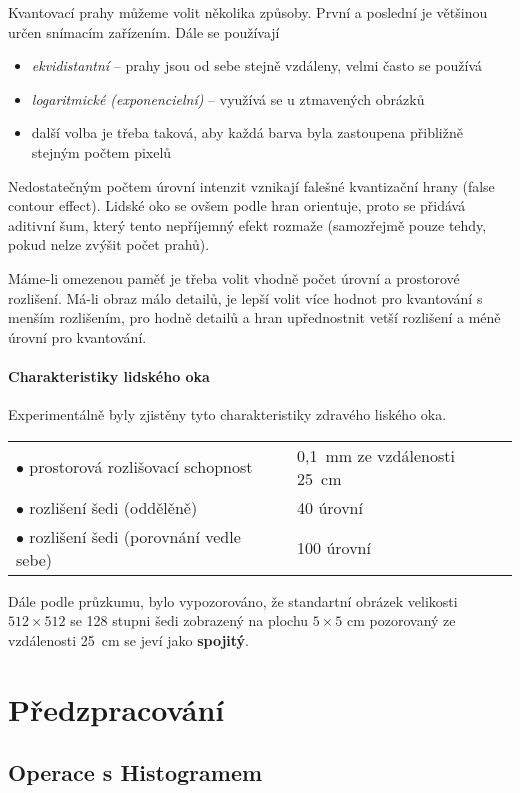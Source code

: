 Kvantovací prahy můžeme volit několika způsoby. První a poslední je většinou určen snímacím zařízením. Dále se používají
\begin{itemize}
\item {\em ekvidistantní} -- prahy jsou od sebe stejně vzdáleny, velmi často se používá
\item {\em logaritmické (exponencielní)} -- využívá se u ztmavených obrázků
\item další volba je třeba taková, aby každá barva byla zastoupena přibližně stejným počtem pixelů
\end{itemize}

Nedostatečným počtem úrovní intenzit  vznikají falešné kvantizační hrany (false contour effect). Lidské oko se ovšem
podle hran orientuje, proto se přidává aditivní šum, který tento nepříjemný efekt rozmaže (samozřejmě pouze tehdy, pokud 
nelze zvýšit počet prahů).

Máme-li omezenou paměť je třeba volit vhodně počet úrovní a prostorové rozlišení.
Má-li obraz málo detailů, je lepší volit více hodnot pro kvantování s menším rozlišením,
pro hodně detailů a hran upřednostnit vetší rozlišení a méně úrovní pro kvantování.

\paragraph{Charakteristiky lidského oka} Experimentálně byly zjistěny tyto charakteristiky  zdravého liského oka.
\medskip

\begin{tabular}{ll}
$\bullet$ prostorová rozlišovací schopnost& 0,1~mm ze vzdálenosti 25~cm\\
$\bullet$ rozlišení šedi (oddělěně) & 40 úrovní \\
$\bullet$ rozlišení šedi (porovnání vedle sebe) & 100 úrovní 
\end{tabular}

\medskip
\noindent Dále podle průzkumu, bylo vypozorováno, že standartní obrázek velikosti $512\times512$ se 128 stupni šedi 
zobrazený na plochu $5\times5$ cm pozorovaný ze vzdálenosti 25~cm se jeví jako {\bf spojitý}.

\section{Předzpracování}
\subsection{Operace s Histogramem}

